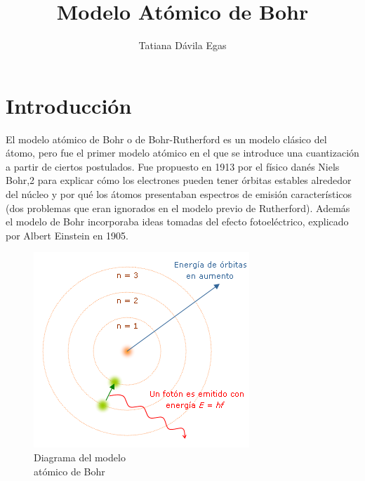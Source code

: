 \documentclass[12pt,a4paper]{article}
\author{Tatiana Dávila Egas}
\title{Modelo Atómico de Bohr}
\date{}
\begin{document}
\maketitle
\section{Introducción}
El modelo atómico de Bohr o de Bohr-Rutherford es un modelo clásico del átomo, pero fue el primer modelo atómico en el que se introduce una cuantización a partir de ciertos postulados. Fue propuesto en 1913 por el físico danés Niels Bohr,2 para explicar cómo los electrones pueden tener órbitas estables alrededor del núcleo y por qué los átomos presentaban espectros de emisión característicos (dos problemas que eran ignorados en el modelo previo de Rutherford). Además el modelo de Bohr incorporaba ideas tomadas del efecto fotoeléctrico, explicado por Albert Einstein en 1905.
\begin{figure}[!ht]
\includegraphics[scale=0.6]{Modelo_de_Bohr.png}
\centering 
\caption{Diagrama del modelo\\ atómico de Bohr}
\end{figure}
\end{document}
